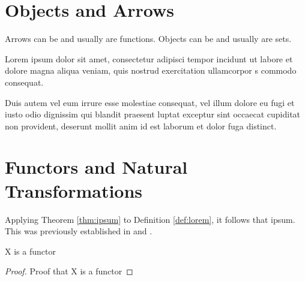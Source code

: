 \documentclass{article}
\begin{document}
\section{Objects and Arrows}
Arrows can be and usually are functions. Objects can be and usually are sets.

Lorem ipsum dolor sit amet, consectetur adipisci tempor incidunt ut labore et dolore magna aliqua veniam, quis nostrud exercitation ullamcorpor s commodo consequat. 

\begin{theorem}\label{thm:ipsum}
	Duis autem vel eum irrure esse molestiae consequat, vel illum dolore eu fugi et iusto odio dignissim qui blandit praesent luptat exceptur sint occaecat cupiditat non provident, deserunt mollit anim id est laborum et dolor fuga distinct.
\end{theorem}



\section{Functors and Natural Transformations}

Applying Theorem \ref{thm:ipsum} to Definition \ref{def:lorem}, it follows that ipsum. This was previously established in \cite{Gauss86} and \cite{Euclid02,Euclid03}.

\begin{theorem}
X is a functor
\end{theorem}
\begin{proof}
Proof that X is a functor
\end{proof}





\end{document}
